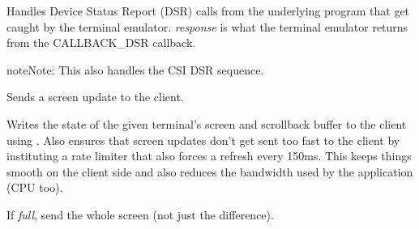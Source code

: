 \documentclass[letterpaper,10pt,openany]{sphinxmanual}
\begin{document}
\begin{fulllineitems}
\begin{fulllineitems}
\end{fulllineitems}


\begin{fulllineitems}
\label{Applications/terminal/app_terminal:app_terminal.TerminalApplication.dsr}
Handles Device Status Report (DSR) calls from the underlying program
that get caught by the terminal emulator.  \emph{response} is what the
terminal emulator returns from the CALLBACK\_DSR callback.

\begin{notice}{note}{Note:}
This also handles the CSI DSR sequence.
\end{notice}

\end{fulllineitems}


\begin{fulllineitems}
\label{Applications/terminal/app_terminal:app_terminal.TerminalApplication._send_refresh}
Sends a screen update to the client.

\end{fulllineitems}


\begin{fulllineitems}
\label{Applications/terminal/app_terminal:app_terminal.TerminalApplication.refresh_screen}
Writes the state of the given terminal's screen and scrollback buffer to
the client using {\hyperref[Applications/terminal/app_terminal:app_terminal.TerminalApplication._send_refresh]{}}.  Also ensures that screen updates
don't get sent too fast to the client by instituting a rate limiter that
also forces a refresh every 150ms.  This keeps things smooth on the
client side and also reduces the bandwidth used by the application (CPU
too).

If \emph{full}, send the whole screen (not just the difference).

\end{fulllineitems}



\end{fulllineitems}
\end{document}
